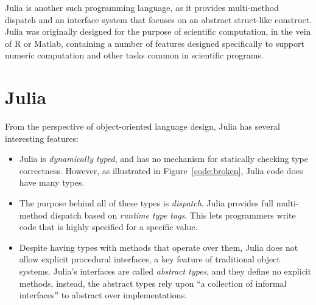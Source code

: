 \documentclass[preprint]{sigplanconf}
\begin{document}
Julia is another such programming language, as it provides multi-method dispatch 
and an interface system that focuses on an abstract struct-like construct. 
Julia was originally designed for the purpose of scientific computation, in the vein of 
R or Matlab\cite{bezan}, containing a number of features designed specifically to support 
numeric computation and other tasks common in scientific programs.


\section{Julia}

From the perspective of object-oriented language design, Julia has several 
interesting features:
\begin{itemize}
\item Julia is \emph{dynamically typed}, and has no mechanism for statically
checking type correctness. However, as illustrated in Figure~\ref{code:broken},
Julia code does have many types.
\item The purpose behind all of these types is \emph{dispatch}. Julia provides 
full multi-method dispatch based on \emph{runtime type tags}. This lets programmers
write code that is highly specified for a specific value. 
\item Despite having types with methods that operate over them, Julia does not 
allow explicit procedural interfaces, a key feature of traditional object 
systems. Julia's interfaces are called \emph{abstract types}, and they define no 
explicit methods, instead, the abstract types rely upon ``a collection of informal interfaces''
\cite{juliadocu} to abstract over implementations. 
\end{itemize}
\end{document}
